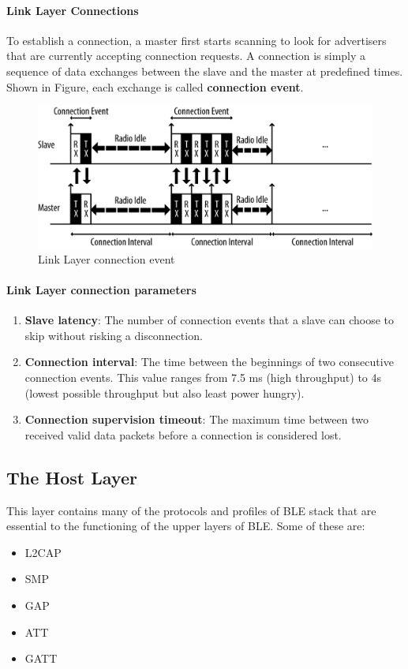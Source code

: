 \paragraph{Link Layer Connections}
To establish a connection, a master first starts scanning to look for advertisers that are currently accepting connection requests. A connection is simply a sequence of data exchanges between the slave and the master at predefined times. Shown in Figure, each exchange is called \textbf{connection event}.
\begin{figure}[ht]
	\centering
	\includegraphics[scale=0.35]{images/connection_event.png}
	\caption{Link Layer connection event}
\end{figure}
\paragraph{Link Layer connection parameters}
\begin{enumerate}
	\item \textbf{Slave latency}: The number of connection events that a slave can choose to skip without risking a disconnection.
	\item \textbf{Connection interval}: The time between the beginnings of two consecutive connection events. This value ranges from 7.5 ms (high throughput) to 4s (lowest possible throughput but also least power hungry).
	\item \textbf{Connection supervision timeout}: The maximum time between two received valid data packets before a connection is considered lost.
\end{enumerate}
\subsection{The Host Layer}
This layer contains many of the protocols and profiles of BLE stack that are essential to the functioning of the upper layers of BLE. Some of these are:
\begin{itemize}
	\item L2CAP
	\item SMP
	\item GAP
	\item ATT
	\item GATT
\end{itemize}
